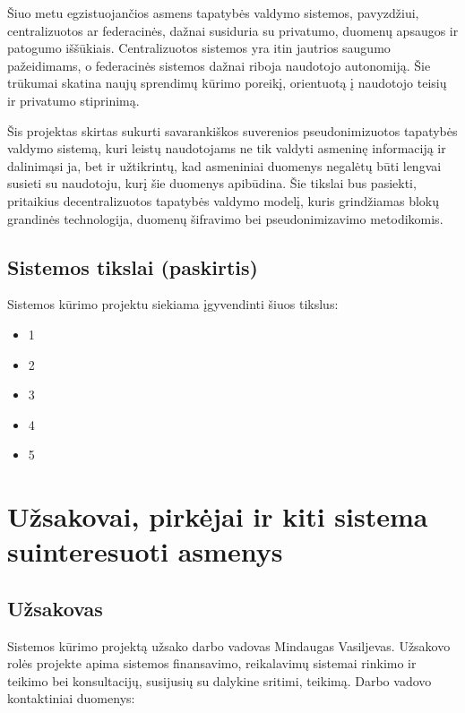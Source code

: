 \documentclass[12pt]{article}
\begin{document}
Šiuo metu egzistuojančios asmens tapatybės valdymo sistemos, pavyzdžiui,
centralizuotos ar federacinės, dažnai susiduria su privatumo, duomenų apsaugos
ir patogumo iššūkiais. Centralizuotos sistemos yra itin jautrios saugumo
pažeidimams, o federacinės sistemos dažnai riboja naudotojo autonomiją. Šie
trūkumai skatina naujų sprendimų kūrimo poreikį, orientuotą į naudotojo teisių
ir privatumo stiprinimą.

Šis projektas skirtas sukurti savarankiškos suverenios pseudonimizuotos
tapatybės valdymo sistemą, kuri leistų naudotojams
ne tik valdyti asmeninę informaciją ir dalinimąsi ja, bet ir užtikrintų, kad
asmeniniai duomenys negalėtų būti lengvai susieti su naudotoju, kurį šie
duomenys apibūdina. Šie tikslai bus pasiekti, pritaikius decentralizuotos
tapatybės valdymo modelį, kuris grindžiamas blokų grandinės technologija,
duomenų šifravimo bei pseudonimizavimo metodikomis.

\subsection{Sistemos tikslai (paskirtis)}
Sistemos kūrimo projektu siekiama įgyvendinti šiuos tikslus:
\begin{itemize}
    \item 1
    \item 2
    \item 3
    \item 4
    \item 5
\end{itemize}

\section{Užsakovai, pirkėjai ir kiti sistema suinteresuoti asmenys}
\subsection{Užsakovas}
Sistemos kūrimo projektą užsako darbo vadovas Mindaugas Vasiljevas. Užsakovo
rolės projekte apima sistemos finansavimo, reikalavimų sistemai rinkimo ir
teikimo bei konsultacijų, susijusių su dalykine sritimi, teikimą.
Darbo vadovo kontaktiniai duomenys:
\end{document}
